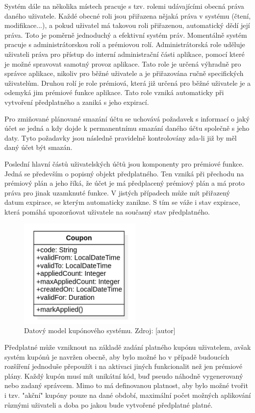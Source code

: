 		Systém dále na několika místech pracuje s tzv. rolemi udávajícími obecná práva daného uživatele.
		Každé obecné roli jsou přiřazena nějaká práva v systému (čtení, modifikace...), a pokud uživatel má takovou roli
		přiřazenou, automatický dědí její práva.
		Toto je poměrně jednoduchý a efektivní systém práv.
		Momentálně systém pracuje s administrátorskou rolí a prémiovou rolí.
		Administrátorská role uděluje uživateli práva pro přístup do interní administrační části
		aplikace, pomocí které je možné spravovat samotný provoz aplikace.
		Tato role je určená výhradně pro správce aplikace, nikoliv pro běžné uživatele a je přiřazována ručně specifických
		uživatelům.
		Druhou rolí je role prémiová, která již určená pro běžné uživatele je a odemyká jim prémiové funkce aplikace.
		Tato role vzniká automaticky při vytvoření předplatného a zaniká s jeho expirací.

		Pro zmiňované plánované smazání účtu se uchovává požadavek s informací o jaký účet se jedná a kdy dojde k permanentnímu
		smazání daného účtu společně s jeho daty.
		Tyto požadavky jsou následně pravidelně kontrolovány zda-li již by měl daný účet být smazán.

		Poslední hlavní částů uživatelských účtů jsou komponenty pro prémiové funkce.
		Jedná se především o popisný objekt předplatného.
		Ten vzniká při přechodu na prémiový plán a jeho říká, že účet je má předplacený prémiový plán a má proto práva pro
		jinak uzamknuté funkce.
		V jistých případech může mít přiřazený datum expirace, se kterým automaticky zanikne.
		S tím se váže i stav expirace, která pomáhá upozorňovat uživatele na současný stav předplatného.

		\begin{figure}[H]
			\centering
			\includegraphics[width=6cm]{obrazky/datovy_model_kupon}\hfill
			\caption{Datový model kupónového systému. Zdroj: [autor]}
		\end{figure}

		Předplatné může vzniknout na základě zadání platného kupónu uživatelem, avšak systém kupónů je navržen obecně, aby
		bylo možné ho v případě budoucích rozšíření jednoduše přepoužít i na aktivaci jiných funkcionalit než jen
		prémiové plány.
		Každý kupón musí mít unikátní kód, buď pseudo náhodně vygenerovaný nebo zadaný správcem.
		Mimo to má definovanou platnost, aby bylo možné tvořit i tzv. "akční" kupóny pouze na dané období, maximální počet
		možných aplikování různými uživateli a doba po jakou bude vytvořené předplatné platné.


